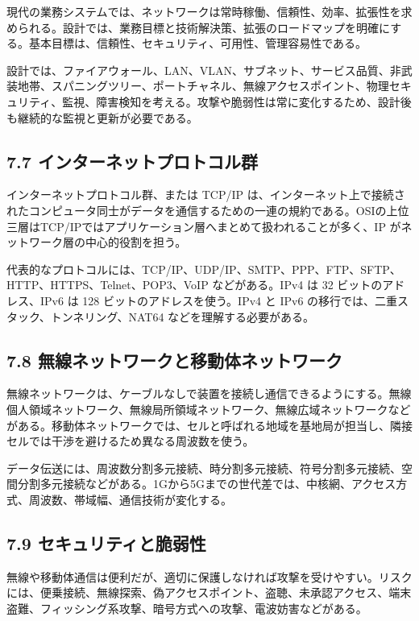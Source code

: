 \documentclass[a4paper,11pt]{ltjsarticle}
\begin{document}
現代の業務システムでは、ネットワークは常時稼働、信頼性、効率、拡張性を求められる。設計では、業務目標と技術解決策、拡張のロードマップを明確にする。基本目標は、信頼性、セキュリティ、可用性、管理容易性である。

設計では、ファイアウォール、LAN、VLAN、サブネット、サービス品質、非武装地帯、スパニングツリー、ポートチャネル、無線アクセスポイント、物理セキュリティ、監視、障害検知を考える。攻撃や脆弱性は常に変化するため、設計後も継続的な監視と更新が必要である。

\subsection{7.7 インターネットプロトコル群}

インターネットプロトコル群、または TCP/IP は、インターネット上で接続されたコンピュータ同士がデータを通信するための一連の規約である。OSIの上位三層はTCP/IPではアプリケーション層へまとめて扱われることが多く、IP がネットワーク層の中心的役割を担う。

代表的なプロトコルには、TCP/IP、UDP/IP、SMTP、PPP、FTP、SFTP、HTTP、HTTPS、Telnet、POP3、VoIP などがある。IPv4 は 32 ビットのアドレス、IPv6 は 128 ビットのアドレスを使う。IPv4 と IPv6 の移行では、二重スタック、トンネリング、NAT64 などを理解する必要がある。

\subsection{7.8 無線ネットワークと移動体ネットワーク}

無線ネットワークは、ケーブルなしで装置を接続し通信できるようにする。無線個人領域ネットワーク、無線局所領域ネットワーク、無線広域ネットワークなどがある。移動体ネットワークでは、セルと呼ばれる地域を基地局が担当し、隣接セルでは干渉を避けるため異なる周波数を使う。

データ伝送には、周波数分割多元接続、時分割多元接続、符号分割多元接続、空間分割多元接続などがある。1Gから5Gまでの世代差では、中核網、アクセス方式、周波数、帯域幅、通信技術が変化する。

\subsection{7.9 セキュリティと脆弱性}

無線や移動体通信は便利だが、適切に保護しなければ攻撃を受けやすい。リスクには、便乗接続、無線探索、偽アクセスポイント、盗聴、未承認アクセス、端末盗難、フィッシング系攻撃、暗号方式への攻撃、電波妨害などがある。
\end{document}
